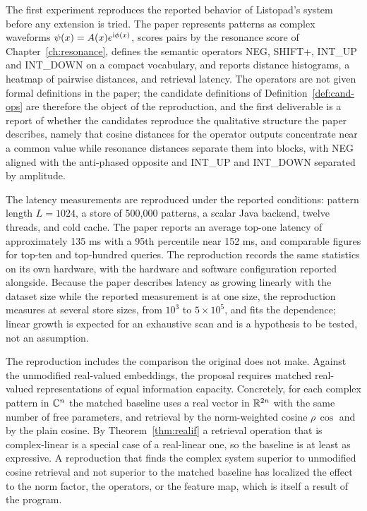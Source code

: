 The first experiment reproduces the reported behavior of Listopad's system \cite{listopad2025} before any extension is tried. The paper represents patterns as complex waveforms $\psi(x)=A(x)e^{\mathrm{i}\phi(x)}$, scores pairs by the resonance score of Chapter~\ref{ch:resonance}, defines the semantic operators NEG, SHIFT+, INT\_UP and INT\_DOWN on a compact vocabulary, and reports distance histograms, a heatmap of pairwise distances, and retrieval latency. The operators are not given formal definitions in the paper; the candidate definitions of Definition~\ref{def:cand-ops} are therefore the object of the reproduction, and the first deliverable is a report of whether the candidates reproduce the qualitative structure the paper describes, namely that cosine distances for the operator outputs concentrate near a common value while resonance distances separate them into blocks, with NEG aligned with the anti-phased opposite and INT\_UP and INT\_DOWN separated by amplitude.

The latency measurements are reproduced under the reported conditions: pattern length $L=1024$, a store of 500{,}000 patterns, a scalar Java backend, twelve threads, and cold cache. The paper reports an average top-one latency of approximately 135 ms with a 95th percentile near 152 ms, and comparable figures for top-ten and top-hundred queries. The reproduction records the same statistics on its own hardware, with the hardware and software configuration reported alongside. Because the paper describes latency as growing linearly with the dataset size while the reported measurement is at one size, the reproduction measures at several store sizes, from $10^3$ to $5\times10^5$, and fits the dependence; linear growth is expected for an exhaustive scan and is a hypothesis to be tested, not an assumption.

The reproduction includes the comparison the original does not make. Against the unmodified real-valued embeddings, the proposal requires matched real-valued representations of equal information capacity. Concretely, for each complex pattern in $\mathbb{C}^n$ the matched baseline uses a real vector in $\mathbb{R}^{2n}$ with the same number of free parameters, and retrieval by the norm-weighted cosine $\rho\,\cos$ and by the plain cosine. By Theorem~\ref{thm:realif} a retrieval operation that is complex-linear is a special case of a real-linear one, so the baseline is at least as expressive. A reproduction that finds the complex system superior to unmodified cosine retrieval and not superior to the matched baseline has localized the effect to the norm factor, the operators, or the feature map, which is itself a result of the program.

